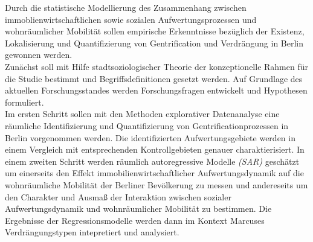 \begin{itemize}
Durch die statistische Modellierung des Zusammenhang zwischen immoblienwirtschaftlichen sowie sozialen Aufwertungsprozessen und wohnräumlicher Mobilität sollen empirische Erkenntnisse bezüglich der Existenz, Lokalisierung und Quantifizierung von Gentrification und Verdrängung in Berlin gewonnen werden. \\
Zunächst soll mit Hilfe stadtsoziologischer Theorie der konzeptionelle Rahmen für die Studie bestimmt und Begriffsdefinitionen gesetzt werden. Auf Grundlage des aktuellen Forschungsstandes werden Forschungsfragen entwickelt und Hypothesen formuliert. \\
Im ersten Schritt sollen mit den Methoden explorativer Datenanalyse eine räumliche Identifizierung und Quantifizierung von Gentrificationprozessen in Berlin vorgenommen werden. Die identifizierten Aufwertungsgebiete werden in einem Vergleich mit entsprechenden Kontrollgebieten genauer charaktierisiert. In einem zweiten Schritt werden räumlich autoregressive Modelle \textit{(\ac{SAR})} geschätzt um einerseits den Effekt immobilienwirtschaftlicher Aufwertungsdynamik auf die wohnräumliche Mobilität der Berliner Bevölkerung zu messen und andereseits um den Charakter und Ausmaß der Interaktion zwischen sozialer Aufwertungsdynamik und wohnräumlicher Mobilität zu bestimmen. Die Ergebnisse der Regressionsmodelle werden dann im Kontext Marcuses Verdrängungstypen intepretiert und analysiert.
\end{itemize}
